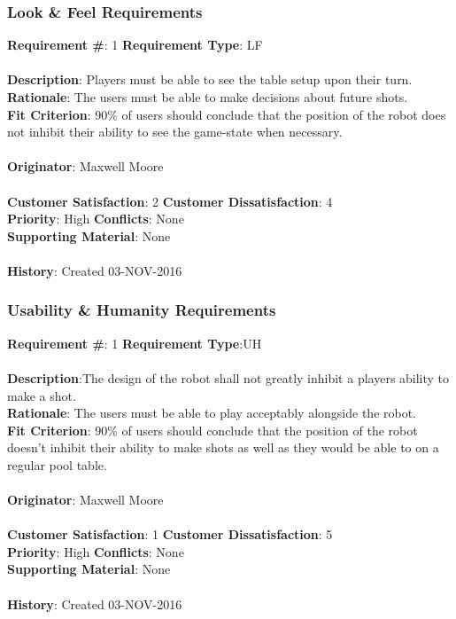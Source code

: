 \documentclass[titlepage]{article}
\begin{document}
\subsubsection{Look \& Feel Requirements}
\begin{framed}
	\noindent\textbf{Requirement \#}: 1 \hfill \textbf{Requirement Type}: LF \hfill\\\\
	\noindent\textbf{Description}: Players must be able to see the table setup upon their turn.\\
	\textbf{Rationale}: The users must be able to make decisions about future shots.\\
	\textbf{Fit Criterion}: 90\% of users should conclude that the position of the robot does not inhibit their ability to see the game-state when necessary.\\\\
	\textbf{Originator}: Maxwell Moore\\\\
	\noindent\textbf{Customer Satisfaction}: 2 \hfill 	\textbf{Customer Dissatisfaction}: 4 \hfill\\
	\textbf{Priority}: High \hfill \textbf{Conflicts}: None \hfill\\
	\textbf{Supporting Material}: None\\\\
	\noindent\textbf{History}: Created 03-NOV-2016
\end{framed}

\subsubsection{Usability \& Humanity Requirements}
\begin{framed}
	\noindent\textbf{Requirement \#}: 1 \hfill \textbf{Requirement Type}:UH \hfill\\\\
	\noindent\textbf{Description}:The design of the robot shall not greatly inhibit a players ability to make a shot.\\
	\textbf{Rationale}: The users must be able to play acceptably alongside the robot.\\
	\textbf{Fit Criterion}: 90\% of users should conclude that the position of the robot doesn't inhibit their ability to make shots as well as they would be able to on a regular pool table.\\\\
	\textbf{Originator}: Maxwell Moore\\\\
	\noindent\textbf{Customer Satisfaction}: 1 \hfill 	\textbf{Customer Dissatisfaction}: 5 \hfill\\
	\textbf{Priority}: High \hfill \textbf{Conflicts}: None \hfill\\
	\textbf{Supporting Material}: None\\\\
	\noindent\textbf{History}: Created 03-NOV-2016
\end{framed}
\end{document}
